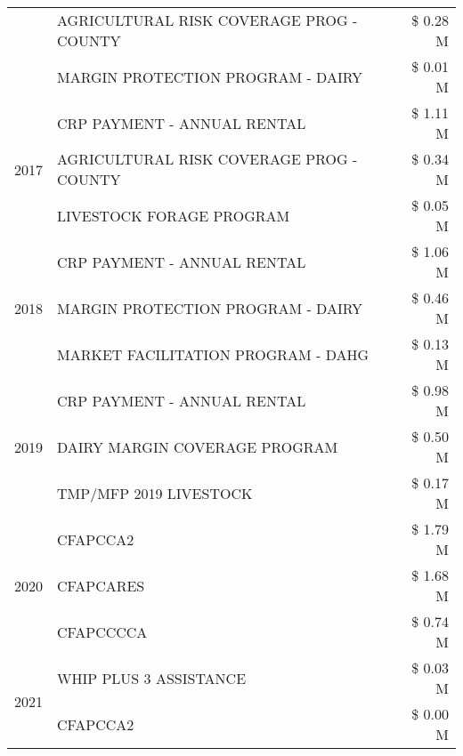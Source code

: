 \begin{tabular}{llr}
 & AGRICULTURAL RISK COVERAGE PROG - COUNTY & \$ 0.28 M \\
 & MARGIN PROTECTION PROGRAM - DAIRY & \$ 0.01 M \\
\cline{1-3}
\multirow[t]{3}{*}{2017} & CRP PAYMENT - ANNUAL RENTAL & \$ 1.11 M \\
 & AGRICULTURAL RISK COVERAGE PROG - COUNTY & \$ 0.34 M \\
 & LIVESTOCK FORAGE PROGRAM & \$ 0.05 M \\
\cline{1-3}
\multirow[t]{3}{*}{2018} & CRP PAYMENT - ANNUAL RENTAL & \$ 1.06 M \\
 & MARGIN PROTECTION PROGRAM - DAIRY & \$ 0.46 M \\
 & MARKET FACILITATION PROGRAM - DAHG & \$ 0.13 M \\
\cline{1-3}
\multirow[t]{3}{*}{2019} & CRP PAYMENT - ANNUAL RENTAL & \$ 0.98 M \\
 & DAIRY MARGIN COVERAGE PROGRAM & \$ 0.50 M \\
 & TMP/MFP 2019 LIVESTOCK & \$ 0.17 M \\
\cline{1-3}
\multirow[t]{3}{*}{2020} & CFAPCCA2 & \$ 1.79 M \\
 & CFAPCARES & \$ 1.68 M \\
 & CFAPCCCCA & \$ 0.74 M \\
\cline{1-3}
\multirow[t]{2}{*}{2021} & WHIP PLUS 3 ASSISTANCE & \$ 0.03 M \\
 & CFAPCCA2 & \$ 0.00 M \\
\cline{1-3}
\bottomrule
\end{tabular}
